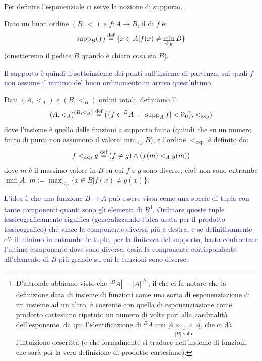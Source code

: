 Per definire l'esponenziale ci serve la nozione di supporto.

\begin{definition}
	Dato un buon ordine $(B,<)$ e $f : A \rightarrow B$, il  di $f$ è:
	\[ \operatorname{supp}_B(f) \overset{\text{def}}{=} \{x \in A | f(x) \ne \min_{<_B} B\}
		\]
	(ometteremo il pedice $B$ quando è chiaro cosa sia $B$).
\end{definition}

\textcolor{MidnightBlue}{Il supporto è quindi il sottoinsieme dei punti sull'insieme di partenza, sui quali $f$ non assume il minimo del buon ordinamento in arrivo quest'ultimo.}

\begin{definition}
	Dati $(A,<_A)$ e $(B,<_B)$ ordini totali, definiamo l':
	\[ (A,<_A)^{(B,<_B)} \overset{\text{def}}{=} (\{f \in {}^{B}A \, : \, |\operatorname{supp}_A f| < \aleph_0\},<_{\exp})
		\]
	dove l'insieme è quello delle funzioni a supporto finito (quindi che su un numero finito di punti non assumono il valore $\min_{<_B}B$), e l'ordine $<_{\exp}$ è definito da:
	\[ f <_{\exp} g \overset{\text{def}}{=} (f \ne g) \land (f(m) <_A g(m))
		 \]
	dove $m$ è il massimo valore in $B$ su cui $f$ e $g$ sono diverse, cioè non sono entrambe $\min A$, $m := \max_{<_B}\{x \in B | f(x) \ne g(x)\}$.
\end{definition}

\textcolor{MidnightBlue}{L'idea è che una funzione $B \rightarrow A$ può essere vista come una specie di tupla con tante componenti quanti sono gli elementi di $B$\footnote{D'altronde abbiamo visto che $|{}^{B}A| = |A|^{|B|}$, il che ci fa notare che la definizione data di insieme di funzioni come una sorta di esponenziazione di un insieme ad un altro, è coerente con quella di esponenziazione come prodotto cartesiano ripetuto un numero di volte pari alla cardinalità dell'esponente, da qui l'identificazione di ${}^{B}A$ con $\underbrace{A \times \ldots \times A}_{\text{$|B|$ volte}}$, che ci dà l'intuizione descritta (e che formalmente si traduce nell'insieme di funzioni, che sarà poi la vera definizione di prodotto cartesiano).}.
Ordinare queste tuple lessicograficamente significa (generalizzando l'idea usata per il prodotto lessicografico) che vince la componente diversa più a destra, e se definitivamente c'è il minimo in entrambe le tuple, per la finitezza del supporto, basta confrontare l'ultima componente dove sono diverse, ossia la componente corrispondente all'elemento di $B$ più grande su cui le funzioni sono diverse.}

